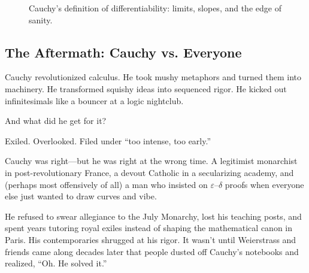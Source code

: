 \begin{figure}[H]
\centering
{}
\caption{Cauchy's definition of differentiability: limits, slopes, and the edge of sanity.}
\end{figure}


\subsection{The Aftermath: Cauchy vs. Everyone}

Cauchy revolutionized calculus. He took mushy metaphors and turned them into machinery. He transformed squishy ideas into sequenced rigor. He kicked out infinitesimals like a bouncer at a logic nightclub.

And what did he get for it?

Exiled. Overlooked. Filed under “too intense, too early.”

Cauchy was right—but he was right at the wrong time. A legitimist monarchist in post-revolutionary France, a devout Catholic in a secularizing academy, and (perhaps most offensively of all) a man who insisted on $\varepsilon$–$\delta$ proofs when everyone else just wanted to draw curves and vibe.

He refused to swear allegiance to the July Monarchy, lost his teaching posts, and spent years tutoring royal exiles instead of shaping the mathematical canon in Paris. His contemporaries shrugged at his rigor. It wasn’t until Weierstrass and friends came along decades later that people dusted off Cauchy’s notebooks and realized, “Oh. He solved it.”

